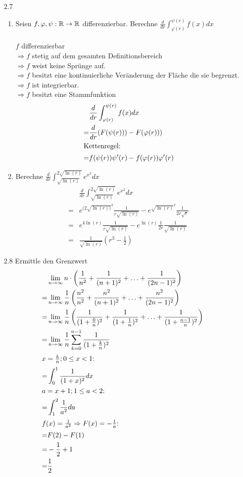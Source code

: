 \documentclass{HM}
\begin{document}
\begin{enumerate}
		\item[2.7]
		\begin{enumerate}
			\item Seien $f,\varphi,\psi:\mathbb{R}\to\mathbb{R}$ differenzierbar. Berechne $\frac{d}{dr}\int_{\varphi(r)}^{\psi(r)}f(x)dx$\\\\
			$f$ differenzierbar\\
			$\Rightarrow f$ stetig auf dem gesamten Definitionsbereich\\
			$\Rightarrow f$ weist keine Sprünge auf.\\
			$\Rightarrow f$ besitzt eine kontinuierliche Veränderung der Fläche die sie begrenzt.\\
			$\Rightarrow f$ ist integrierbar.\\
			$\Rightarrow f$ besitzt eine Stammfunktion
			\begin{align*}
			&\frac{d}{dr}\int_{\varphi(r)}^{\psi(r)}f(x)dx\\
			=&\frac{d}{dr}(F(\psi(r)))-F(\varphi(r)))\\
			\intertext{Kettenregel:}
			=&f(\psi(r))\psi'(r)-f(\varphi(r))\varphi'(r)
			\end{align*}
			\item Berechne $\frac{d}{dr}\int_{\sqrt{\ln(r)}}^{2\sqrt{\ln(r)}}e^{x^2}dx$
			\begin{align*}
			&\frac{d}{dr}\int_{\sqrt{\ln(r)}}^{2\sqrt{\ln(r)}}e^{x^2}dx\\
			=&e^{(2\sqrt{\ln(r))}^2}\frac{1}{r\sqrt{\ln(r)}}-e^{\sqrt{\ln(r)}^2}\frac{1}{2r\sqrt{r}}\\
			=&e^{4\ln(r)}\frac{1}{r\sqrt{\ln(r)}}-e^{\ln(r)}\frac{1}{2r}\frac{1}{\sqrt{\ln(r)}}\\
			=&\frac{1}{\sqrt{\ln(r)}}(r^3-\frac{1}{2})
			\end{align*}
		\end{enumerate}
		\item [2.8] Ermittle den Grenzwert
		\begin{align*}
		&\lim_{n\to\infty}n\cdot\left(\frac{1}{n^2}+\frac{1}{(n+1)^2}+\hdots+\frac{1}{(2n-1)^2}\right)\\
		=&\lim_{n\to\infty}\frac{1}{n}\left(\frac{n^2}{n^2}+\frac{n^2}{(n+1)^2}+\hdots+\frac{n^2}{(2n-1)^2}\right)\\
		=&\lim_{n\to\infty}\frac{1}{n}\left(\frac{1}{(1+\tfrac{0}{n})^2}+\frac{1}{(1+\tfrac{1}{n})^2}+\hdots+\frac{1}{(1+\tfrac{n-1}{n})^2}\right)\\
		=&\lim_{n\to\infty}\frac{1}{n}\sum\limits_{k=0}^{n-1}\frac{1}{(1+\tfrac{k}{n})^2}\\
		\intertext{$x=\frac{k}{n}; 0\leq x < 1$:}
		=&\int_0^1\frac{1}{(1+x)^2}dx\\
		\intertext{$a=x+1; 1\leq a<2$:}
		=&\int_1^2\frac{1}{a^2}da\\
		\intertext{$f(x)=\frac{1}{a^2}\Rightarrow F(x)=-\frac{1}{a}$:}
		=&F(2)-F(1)\\
		=&-\frac{1}{2}+1\\
		=&\frac{1}{2}
		\end{align*}
	\end{enumerate}
\end{document}
